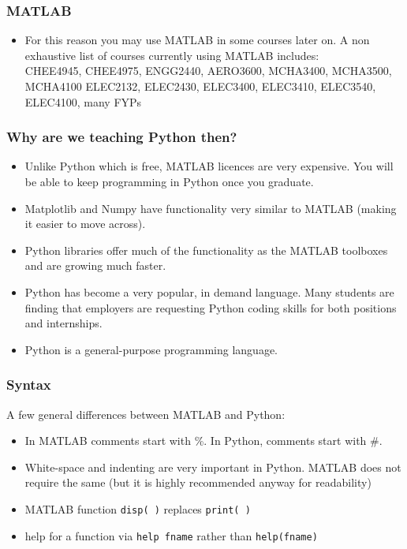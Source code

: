 \documentclass[english,14pt]{beamer}
\begin{document}

\begin{frame}[fragile]
\frametitle{MATLAB}
\begin{itemize}
\item For this reason you may use MATLAB in some courses later on. A non exhaustive list of courses currently using MATLAB includes: \\

CHEE4945, CHEE4975,  ENGG2440, AERO3600, MCHA3400, MCHA3500, MCHA4100 ELEC2132, ELEC2430, ELEC3400, ELEC3410, ELEC3540, ELEC4100, many FYPs
\end{itemize}
\end{frame}


\begin{frame}[fragile]

\frametitle{Why are we teaching Python then?}

\begin{itemize}
	\item Unlike Python which is free, MATLAB licences are very expensive. You will be able to keep programming in Python once you graduate.  
	\item Matplotlib and Numpy have functionality very similar to MATLAB (making it easier to move across).
	\item Python libraries offer much of the functionality as the MATLAB toolboxes and are growing much faster. 
	\item Python has become a very popular, in demand language. Many students are finding that employers are requesting Python coding skills for both positions and internships. 
	\item Python is a general-purpose programming language. 
\end{itemize}
\end{frame}


\begin{frame}[fragile]

\frametitle{Syntax}

A few general differences between MATLAB and Python:

\begin{itemize}
	\item In MATLAB comments start with \%. In Python, comments start with \#.
	\item White-space and indenting are very important in Python. MATLAB does not require the same (but it is highly recommended anyway for readability) 
	\item MATLAB function \texttt{disp( )} replaces \texttt{print( )}
	\item help for a function via \texttt{help fname} rather than \texttt{help(fname)}
\end{itemize}
\end{frame}
\end{document}
